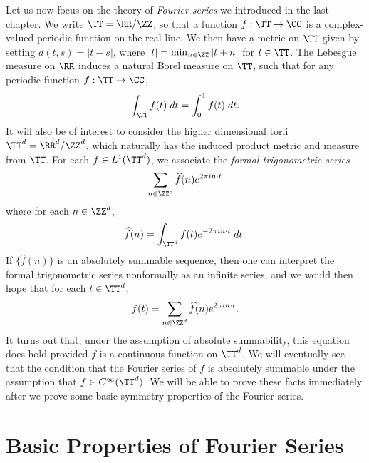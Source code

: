 Let us now focus on the theory of \emph{Fourier series} we introduced in the last chapter. We write $\TT = \RR / \ZZ$, so that a function $f: \TT \to \CC$ is a complex-valued periodic function on the real line. We then have a metric on $\TT$ given by setting $d(t,s) = |t - s|$, where $|t| = \min_{n \in \ZZ} |t + n|$ for $t \in \TT$. The Lebesgue measure on $\RR$ induces a natural Borel measure on $\TT$, such that for any periodic function $f: \TT \to \CC$,
%
\[ \int_{\TT} f(t)\; dt = \int_0^1 f(t)\; dt. \]
%
It will also be of interest to consider the higher dimensional torii $\TT^d = \RR^d / \ZZ^d$, which naturally has the induced product metric and measure from $\TT$. For each $f \in L^1(\TT^d)$, we associate the \emph{formal trigonometric series}
%
\[ \sum_{n \in \ZZ^d} \widehat{f}(n) e^{2 \pi i n \cdot t} \]
%
where for each $n \in \ZZ^d$,
%
\[ \widehat{f}(n) = \int_{\TT^d} f(t) e^{-2\pi i n \cdot t}\; dt. \]
%
If $\{ \widehat{f}(n) \}$ is an absolutely summable sequence, then one can interpret the formal trigonometric series nonformally as an infinite series, and we would then hope that for each $t \in \TT^d$,
%
\[ f(t) = \sum_{n \in \ZZ^d} \widehat{f}(n) e^{2 \pi i n \cdot t}. \]
%
It turns out that, under the assumption of absolute summability, this equation does hold provided $f$ is a continuous function on $\TT^d$. We will eventually see that the condition that the Fourier series of $f$ is absolutely summable under the assumption that $f \in C^\infty(\TT^d)$. We will be able to prove these facts immediately after we prove some basic symmetry properties of the Fourier series.

\section{Basic Properties of Fourier Series}

